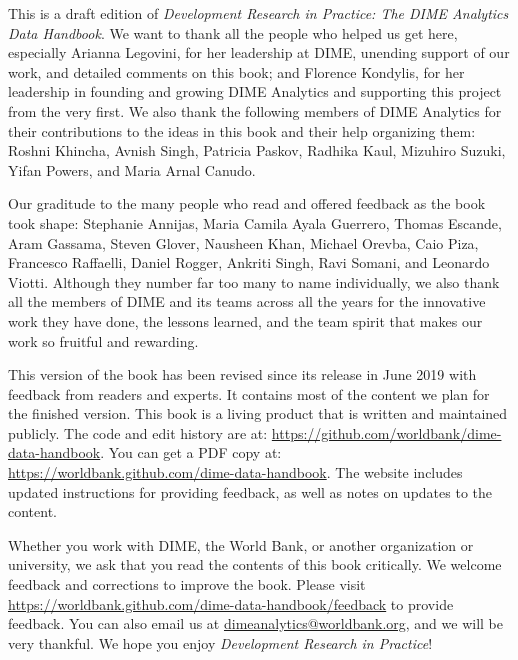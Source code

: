 This is a draft edition of
\textit{Development Research in Practice:
The DIME Analytics Data Handbook}.
We want to thank all the people who helped us get here, especially
Arianna Legovini, for her leadership at DIME, unending support of our work, 
and detailed comments on this book; and 
Florence Kondylis, for her leadership in founding and growing DIME Analytics
and supporting this project from the very first.
We also thank the following members 
of DIME Analytics for their contributions 
to the ideas in this book and their help organizing them: 
Roshni Khincha, Avnish Singh, Patricia Paskov, Radhika Kaul,
Mizuhiro Suzuki, Yifan Powers, and Maria Arnal Canudo.

Our graditude to the many people who read and offered feedback as the book took shape:
Stephanie Annijas,
Maria Camila Ayala Guerrero,
Thomas Escande,
Aram Gassama,
Steven Glover,
Nausheen Khan,
Michael Orevba,
Caio Piza,
Francesco Raffaelli,
Daniel Rogger,
Ankriti Singh,
Ravi Somani,
and Leonardo Viotti.
Although they number far too many to name individually, 
we also thank all the members of DIME and its teams across all the years
for the innovative work they have done, the lessons learned,
and the team spirit that makes our work so fruitful and rewarding.

This version of the book has been revised since its release in June 2019
with feedback from readers and experts.
It contains most of the content we plan for the finished version.
This book is a living product that is written and maintained publicly.
The code and edit history are at:
\url{https://github.com/worldbank/dime-data-handbook}.
You can get a PDF copy at:
\url{https://worldbank.github.com/dime-data-handbook}.
The website includes updated instructions
for providing feedback, as well as notes on updates to the content.

Whether you work with DIME, the World Bank,
or another organization or university,
we ask that you read the contents of this book critically.
We welcome feedback and corrections to improve the book. 
Please visit
\url{https://worldbank.github.com/dime-data-handbook/feedback} 
to provide feedback.
You can also email us at \url{dimeanalytics@worldbank.org}, 
and we will be very thankful.
We hope you enjoy \textit{Development Research in Practice}!
